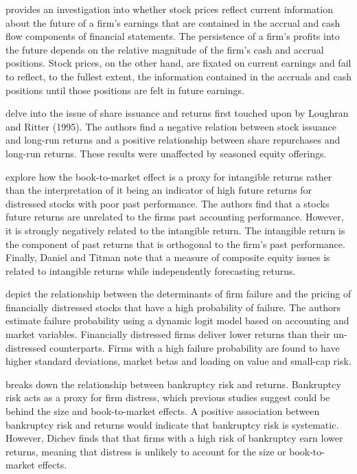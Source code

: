 \documentclass[12pt, a4paper, oneside]{article}
\begin{document}
 provides an investigation into whether stock prices reflect current information about the future of a firm’s earnings that are contained in the accrual and cash flow components of financial statements. The persistence of a firm’s profits into the future depends on the relative magnitude of the firm's cash and accrual positions. Stock prices, on the other hand, are fixated on current earnings and fail to reflect, to the fullest extent, the information contained in the accruals and cash positions until those positions are felt in future earnings. 

 delve into the issue of share issuance and returns first touched upon by Loughran and Ritter (1995). The authors find a negative relation between stock issuance and long-run returns and a positive relationship between share repurchases and long-run returns. These results were unaffected by seasoned equity offerings. 

 explore how the book-to-market effect is a proxy for intangible returns rather than the interpretation of it being an indicator of high future returns for distressed stocks with poor past performance. The authors find that a stocks future returns are unrelated to the firms past accounting performance. However, it is strongly negatively related to the intangible return. The intangible return is the component of past returns that is orthogonal to the firm’s past performance. Finally, Daniel and Titman note that a measure of composite equity issues is related to intangible returns while independently forecasting returns. 

 depict the relationship between the determinants of firm failure and the pricing of financially distressed stocks that have a high probability of failure. The authors estimate failure probability using a dynamic logit model based on accounting and market variables. Financially distressed firms deliver lower returns than their un-distressed counterparts. Firms with a high failure probability are found to have higher standard deviations, market betas and loading on value and small-cap risk. 

 breaks down the relationship between bankruptcy risk and returns. Bankruptcy risk acts as a proxy for firm distress, which previous studies suggest could be behind the size and book-to-market effects. A positive association between bankruptcy risk and returns would indicate that bankruptcy risk is systematic. However, Dichev finds that that firms with a high risk of bankruptcy earn lower returns, meaning that distress is unlikely to account for the size or book-to-market effects. 
\end{document}
